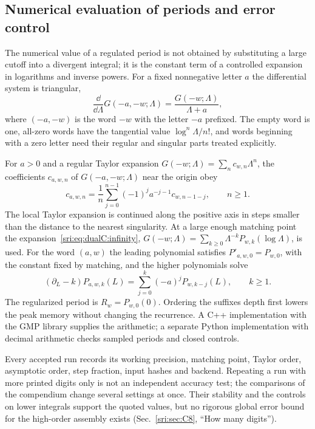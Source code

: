 \subsection{Numerical evaluation of periods and error control}\label{sri:app:dualC:numerics}
The numerical value of a regulated period is not obtained by substituting a large cutoff into a divergent integral; it
is the constant term of a controlled expansion in logarithms and inverse powers. For a fixed nonnegative letter $a$
the differential system is triangular,
\begin{equation}
 \frac{\dd}{\dd\Lambda}G(-a,-w;\Lambda)=\frac{G(-w;\Lambda)}{\Lambda+a},
\end{equation}
where $(-a,-w)$ is the word $-w$ with the letter $-a$ prefixed. The empty word is one, all-zero words have the tangential value
$\log^n\Lambda/n!$, and words beginning with a zero letter need their regular and singular parts treated explicitly.

For $a>0$ and a regular Taylor expansion $G(-w;\Lambda)=\sum_nc_{w,n}\Lambda^n$, the coefficients $c_{a,w,n}$ of $G(-a,-w;\Lambda)$ near the origin obey
\begin{equation}
 c_{a,w,n}=\frac1n\sum_{j=0}^{n-1}(-1)^ja^{-j-1}c_{w,n-1-j},\qquad n\ge1.
\end{equation}
The local Taylor expansion is continued along the positive axis in steps smaller than the distance to the nearest
singularity. At a large enough matching point the expansion~\eqref{sri:eq:dualC:infinity},
$G(-w;\Lambda)=\sum_{k\ge0}\Lambda^{-k}P_{w,k}(\log\Lambda)$, is used. For the word $(a,w)$ the leading polynomial satisfies
$P'_{a,w,0}=P_{w,0}$, with the constant fixed by matching, and the higher polynomials solve
\begin{equation}
 (\partial_L-k)P_{a,w,k}(L)=\sum_{j=0}^k(-a)^jP_{w,k-j}(L),\qquad k\ge1.
\end{equation}
The regularized period is $R_w=P_{w,0}(0)$. Ordering the suffixes depth first lowers the peak memory without changing
the recurrence. A C++ implementation with the GMP library supplies the arithmetic; a separate Python implementation with
decimal arithmetic checks sampled periods and closed controls.

Every accepted run records its working precision, matching point, Taylor order, asymptotic order, step fraction,
input hashes and backend. Repeating a run with more printed digits only is not an independent accuracy test; the
comparisons of the compendium change several settings at once. Their stability and the controls on lower integrals
support the quoted values, but no rigorous global error bound for the high-order assembly exists (Sec.~\ref{sri:sec:C8},
``How many digits'').

